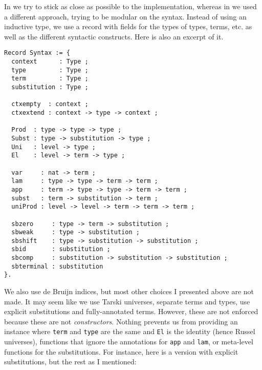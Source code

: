 In \MetaCoq we try to stick as close as possible to the \Coq implementation,
whereas in \ftt we used a different approach, trying to be modular on the
syntax. Instead of using an inductive type, we use a record with fields for the
types of types, terms, etc. as well as the different syntactic constructs.
Here is also an excerpt of it.
\begin{verbatim}
Record Syntax := {
  context      : Type ;
  type         : Type ;
  term         : Type ;
  substitution : Type ;

  ctxempty  : context ;
  ctxextend : context -> type -> context ;

  Prod  : type -> type -> type ;
  Subst : type -> substitution -> type ;
  Uni   : level -> type ;
  El    : level -> term -> type ;

  var     : nat -> term ;
  lam     : type -> type -> term -> term ;
  app     : term -> type -> type -> term -> term ;
  subst   : term -> substitution -> term ;
  uniProd : level -> level -> term -> term -> term ;

  sbzero     : type -> term -> substitution ;
  sbweak     : type -> substitution ;
  sbshift    : type -> substitution -> substitution ;
  sbid       : substitution ;
  sbcomp     : substitution -> substitution -> substitution ;
  sbterminal : substitution
}.
\end{verbatim}
We also use de Bruijn indices, but most other choices I presented above are not
made. It may seem like we use Tarski universes, separate terms and types, use
explicit substitutions and fully-annotated terms.
However, these are not enforced because these are not \emph{constructors}.
Nothing prevents us from providing an instance where \texttt{term}
and \texttt{type} are the same and \texttt{El} is the identity
(hence Russel universes), functions that ignore the annotations for
\texttt{app} and \texttt{lam}, or meta-level functions for
the substitutions.
For instance, here is a version with explicit substitutions, but the rest as I
mentioned:
